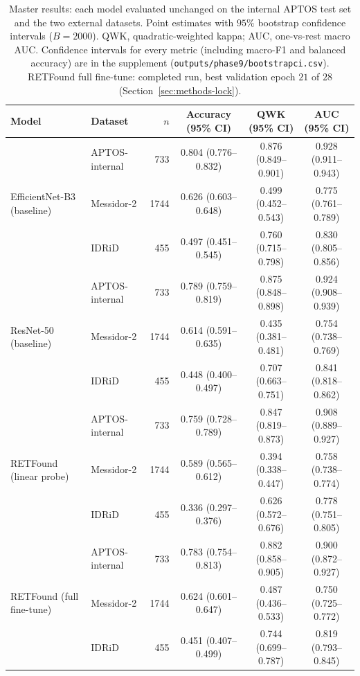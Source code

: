 \documentclass[journal]{IEEEtran}
\renewcommand{\_}{\origunderscore\allowbreak}
\begin{document}
\begin{table}[!t]
\centering\footnotesize
\caption{Master results: each model evaluated unchanged on the internal APTOS test
set and the two external datasets. Point estimates with $95\%$ bootstrap
confidence intervals ($B=2000$). QWK, quadratic-weighted kappa; AUC, one-vs-rest
macro AUC. Confidence intervals for every metric (including macro-F1 and balanced
accuracy) are in the supplement (\texttt{outputs/\allowbreak{}phase9/\allowbreak{}bootstrap\_ci.csv}).
RETFound full fine-tune: completed run, best validation epoch $21$ of $28$
(Section~\ref{sec:methods-lock}).}
\label{tab:master}
\setlength{\tabcolsep}{5pt}
\begin{tabular}{llrccc}
\toprule
Model & Dataset & $n$ & Accuracy (95\% CI) & QWK (95\% CI) & AUC (95\% CI) \\
\midrule
\multirow{3}{*}{EfficientNet-B3 (baseline)}
 & APTOS-internal & 733  & 0.804 (0.776--0.832) & 0.876 (0.849--0.901) & 0.928 (0.911--0.943) \\
 & Messidor-2     & 1744 & 0.626 (0.603--0.648) & 0.499 (0.452--0.543) & 0.775 (0.761--0.789) \\
 & IDRiD          & 455  & 0.497 (0.451--0.545) & 0.760 (0.715--0.798) & 0.830 (0.805--0.856) \\
\midrule
\multirow{3}{*}{ResNet-50 (baseline)}
 & APTOS-internal & 733  & 0.789 (0.759--0.819) & 0.875 (0.848--0.898) & 0.924 (0.908--0.939) \\
 & Messidor-2     & 1744 & 0.614 (0.591--0.635) & 0.435 (0.381--0.481) & 0.754 (0.738--0.769) \\
 & IDRiD          & 455  & 0.448 (0.400--0.497) & 0.707 (0.663--0.751) & 0.841 (0.818--0.862) \\
\midrule
\multirow{3}{*}{RETFound (linear probe)}
 & APTOS-internal & 733  & 0.759 (0.728--0.789) & 0.847 (0.819--0.873) & 0.908 (0.889--0.927) \\
 & Messidor-2     & 1744 & 0.589 (0.565--0.612) & 0.394 (0.338--0.447) & 0.758 (0.738--0.774) \\
 & IDRiD          & 455  & 0.336 (0.297--0.376) & 0.626 (0.572--0.676) & 0.778 (0.751--0.805) \\
\midrule
\multirow{3}{*}{RETFound (full fine-tune)}
 & APTOS-internal & 733  & 0.783 (0.754--0.813) & 0.882 (0.858--0.905) & 0.900 (0.872--0.927) \\
 & Messidor-2     & 1744 & 0.624 (0.601--0.647) & 0.487 (0.436--0.533) & 0.750 (0.725--0.772) \\
 & IDRiD          & 455  & 0.451 (0.407--0.499) & 0.744 (0.699--0.787) & 0.819 (0.793--0.845) \\
\bottomrule
\end{tabular}
\end{table}
\end{document}
